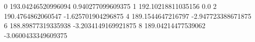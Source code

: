 0 193.04246520996094 0.940277099609375
1 192.10218811035156 0.0
2 190.4764862060547 -1.625701904296875
4 189.1544647216797 -2.947723388671875
6 188.89877319335938 -3.2034149169921875
8 189.04214477539062 -3.0600433349609375
